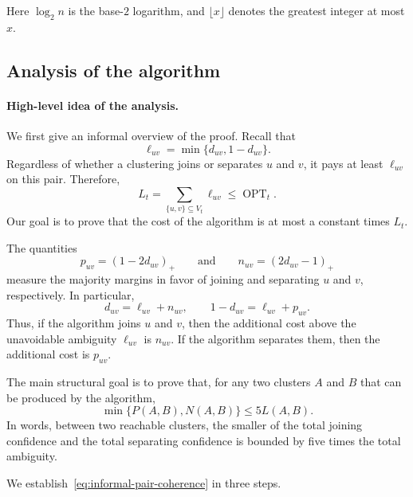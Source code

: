\documentclass[11pt]{article}
\newcommand{\OPT}{\operatorname{OPT}}
\begin{document}
Here $\log_2 n$ is the base-$2$ logarithm, and $\lfloor x\rfloor$ denotes
the greatest integer at most $x$.

\subsection{Analysis of the algorithm}

\paragraph{High-level idea of the analysis.}
We first give an informal overview of the proof.  Recall that
\[
    \ell_{uv}=\min\{d_{uv},1-d_{uv}\}.
\]
Regardless of whether a clustering joins or separates $u$ and $v$, it pays
at least $\ell_{uv}$ on this pair.  Therefore,
\[
    L_t=\sum_{\{u,v\}\subseteq V_t}\ell_{uv}\le \OPT_t.
\]
Our goal is to prove that the cost of the algorithm is at most a constant
times $L_t$.

The quantities
\[
    p_{uv}=(1-2d_{uv})_+
    \qquad\text{and}\qquad
    n_{uv}=(2d_{uv}-1)_+
\]
measure the majority margins in favor of joining and separating $u$ and
$v$, respectively.  In particular,
\[
    d_{uv}=\ell_{uv}+n_{uv},
    \qquad
    1-d_{uv}=\ell_{uv}+p_{uv}.
\]
Thus, if the algorithm joins $u$ and $v$, then the additional cost above
the unavoidable ambiguity $\ell_{uv}$ is $n_{uv}$.  If the algorithm
separates them, then the additional cost is $p_{uv}$.

The main structural goal is to prove that, for any two clusters $A$ and
$B$ that can be produced by the algorithm,
\begin{equation}
    \min\{P(A,B),N(A,B)\}\le 5L(A,B).
    \label{eq:informal-pair-coherence}
\end{equation}
In words, between two reachable clusters, the smaller of the total joining
confidence and the total separating confidence is bounded by five times the
total ambiguity.

We establish~\eqref{eq:informal-pair-coherence} in three steps.
\end{document}

